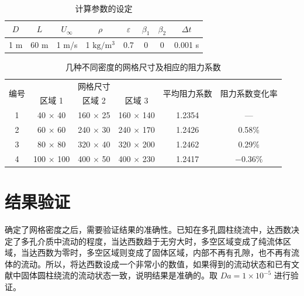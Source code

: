\begin{table}[ht]
	\caption{计算参数的设定}\label{tab: parameters}
	\vspace{.5em}\centering\wuhao
	\begin{tabular}{*{8}{c}}
		\toprule[1.5pt]
		$D$ & $L$ & $U_{\infty}$ & $\rho$ & $\varepsilon$ & $\beta_1$ & $\beta_2$ & $\Delta t$\\
		\midrule[1pt]
		1 m & 60 m & 1 m/s & 1 $\mathrm{kg}/\mathrm{m}^3$ & 0.7 & 0 & 0 & 0.001 s\\
		\bottomrule[1.5pt]
	\end{tabular}
\end{table}

\begin{table}[ht]
	\caption{几种不同密度的网格尺寸及相应的阻力系数}\label{tab: grid}
	\vspace{.5em}\centering\wuhao
	\begin{tabular}{cccccc}
		\toprule[1.5pt]
		\multirow{2}[3]{*}{编号} & \multicolumn{3}{c}{网格尺寸} & \multirow{2}[3]{*}{平均阻力系数} & \multirow{2}[3]{*}{阻力系数变化率} \\
		\cmidrule[.67pt](lr){2-4}
		& 区域 1 & 区域 2 & 区域 3 & & \\
		\midrule[1pt]
		1 & 40 $\times$ 40 & 160 $\times$ 25 & 160 $\times$ 140 & 1.2354 & — \\
		2 & 60 $\times$ 60 & 240 $\times$ 30 & 240 $\times$ 170 & 1.2426 & 0.58\% \\
		3 & 80 $\times$ 80 & 320 $\times$ 40 & 320 $\times$ 200 & 1.2462 & 0.29\% \\
		4 & 100 $\times$ 100 & 400 $\times$ 50 & 400 $\times$ 230 & 1.2417 & $-0.36\%$ \\
		\bottomrule[1.5pt]
	\end{tabular}
\end{table}

\section{结果验证}\label{sec: result validation}

确定了网格密度之后，需要验证结果的准确性。已知在多孔圆柱绕流中，达西数决定了多孔介质中流动的程度，当达西数趋于无穷大时，多空区域变成了纯流体区域，当达西数为零时，多空区域则变成了固体区域，内部不再有孔隙，也不再有流体的流动。所以，将达西数设成一个非常小的数值，如果得到的流动状态和已有文献中固体圆柱绕流的流动状态一致，说明结果是准确的。取 $Da=1\times 10^{-5}$ 进行验证。

